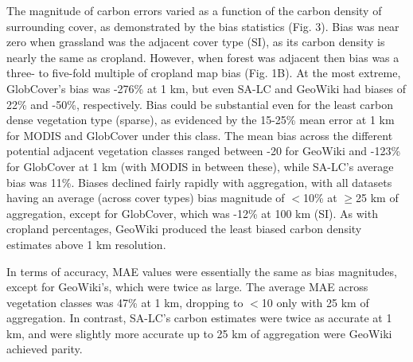 \documentclass{pnastwo}
\begin{document}
\begin{article}
The magnitude of carbon errors varied as a function of the carbon density of surrounding cover, as demonstrated by the bias statistics (Fig. 3). Bias was near zero when grassland was the adjacent cover type (SI), as its carbon density is nearly the same as cropland. However, when forest was adjacent then bias was a three- to five-fold multiple of cropland map bias (Fig. 1B). At the most extreme, GlobCover's bias was -276\% at 1 km, but even SA-LC and GeoWiki had biases of 22\% and -50\%, respectively. Bias could be substantial even for the least carbon dense vegetation type (sparse), as evidenced by the 15-25\% mean error at 1 km for MODIS and GlobCover under this class.  The mean bias across the different potential adjacent vegetation classes ranged between -20 for GeoWiki and -123\% for GlobCover at 1 km (with MODIS in between these), while SA-LC's average bias was 11\%.  Biases declined fairly rapidly with aggregation, with all datasets having an average (across cover types) bias magnitude of $<$10\% at $\geq$25 km of aggregation, except for GlobCover, which was -12\% at 100 km (SI).  As with cropland percentages, GeoWiki produced the least biased carbon density estimates above 1 km resolution. 

In terms of accuracy, MAE values were essentially the same as bias magnitudes, except for GeoWiki's, which were twice as large. The average MAE across vegetation classes was 47\% at 1 km, dropping to $<$10 only with 25 km of aggregation. In contrast, SA-LC's carbon estimates were twice as accurate at 1 km, and were slightly more accurate up to 25 km of aggregation were GeoWiki achieved parity.  


\end{article}
\end{document}
